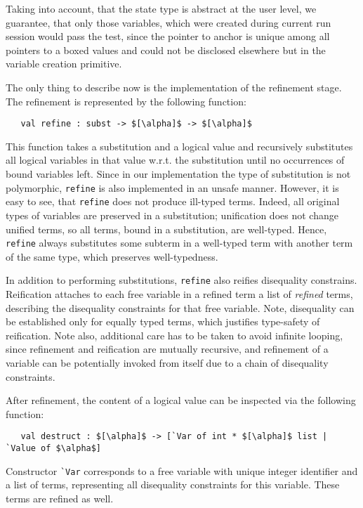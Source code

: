 Taking into account, that the state type is abstract at the user level, we guarantee, that only those variables, which were
created during current run session would pass the test, since the pointer to anchor is unique among all pointers to a boxed values 
and could not be disclosed elsewhere but in the variable creation primitive.

The only thing to describe now is the implementation of the refinement stage. The refinement is represented by the following 
function:

\begin{lstlisting}
   val refine : subst -> $[\alpha]$ -> $[\alpha]$ 
\end{lstlisting}

This function takes a substitution and a logical value and recursively substitutes all logical variables in that value w.r.t. 
the substitution until no occurrences of bound variables left. Since in our implementation the type of substitution is
not polymorphic, \lstinline{refine} is also implemented in an unsafe manner. However, it is easy to see, that \lstinline{refine} 
does not produce ill-typed terms. Indeed, all original types of variables are preserved in a substitution; unification does not 
change unified terms, so all terms, bound in a substitution, are well-typed. Hence, \lstinline{refine} always substitutes
some subterm in a well-typed term with another term of the same type, which preserves well-typedness.

In addition to performing substitutions, \lstinline{refine} also reifies disequality constrains. Reification 
attaches to each free variable in a refined term a list of \emph{refined} terms, describing the disequality constraints for that
free variable. Note, disequality can be established only for equally typed terms, which justifies type-safety of reification. 
Note also, additional care has to be taken to avoid infinite looping, since refinement and reification are
mutually recursive, and refinement of a variable can be potentially invoked from itself due to a chain of disequality 
constraints.

After refinement, the content of a logical value can be inspected via the following function:

\begin{lstlisting}
   val destruct : $[\alpha]$ -> [`Var of int * $[\alpha]$ list | `Value of $\alpha$]
\end{lstlisting}

Constructor \lstinline{`Var} corresponds to a free variable with unique integer identifier and a list of terms, 
representing all disequality constraints for this variable. These terms are refined as well.

